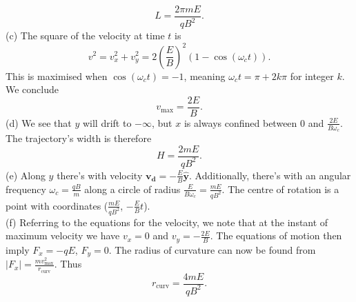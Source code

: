 \documentclass[../TST.tex]{subfiles}
\begin{document}
\begin{solution}
\begin{equation*}
	\boxed{L=\frac{2\pi mE}{qB^2}.}
\end{equation*}
(c) The square of the velocity at time $t$ is 
\begin{equation*}
	v^2=v_x^2+v_y^2=2\left(\frac{E}{B}\right)^2(1-\cos{(\omega_ct)})
.
\end{equation*}
This is maximised when $\cos{(\omega_ct)}=-1$, meaning $\omega_c t = \pi+2k\pi$ for integer $k$. We conclude
\begin{equation*}
\boxed{v_\mathrm{max}=\frac{2E}{B}.}
\end{equation*}
(d) We see that $y$ will drift to $-\infty$, but $x$ is always confined between $0$ and $\frac{2E}{B\omega_c}$. The trajectory's width is therefore
\begin{equation*}
	\boxed{H=\frac{2mE}{qB^2}.}
\end{equation*}
(e) Along $y$ there's  with velocity $\mathbf{v_d}=-\frac{E}{B} \hat{\mathbf{y}}$. Additionally, there's  with an angular frequency $\omega_c=\frac{qB}{m}$ along a circle of radius $\frac{E}{B\omega_c}=\frac{mE}{qB^2}$. The centre of rotation is a point with coordinates ($\frac{mE}{qB^2}$, $-\frac{E}{B}t$).\\

(f) Referring to the equations for the velocity, we note that at the instant of maximum velocity we have $v_x=0$ and $v_y=-\frac{2E}{B}$. The equations of motion then imply $F_x=-qE$, $F_y=0$. The radius of curvature can now be found from $|F_x|=\frac{mv_\mathrm{max}^2}{r_\mathrm{curv}}$. Thus
\begin{equation*}
	\boxed{r_\mathrm{curv}=\frac{4mE}{qB^2}.}
\end{equation*}


\end{solution}
\fi
\ifprob 
	\clearpage
\else 
	\vspace*{5mm}
\fi
\end{document}
